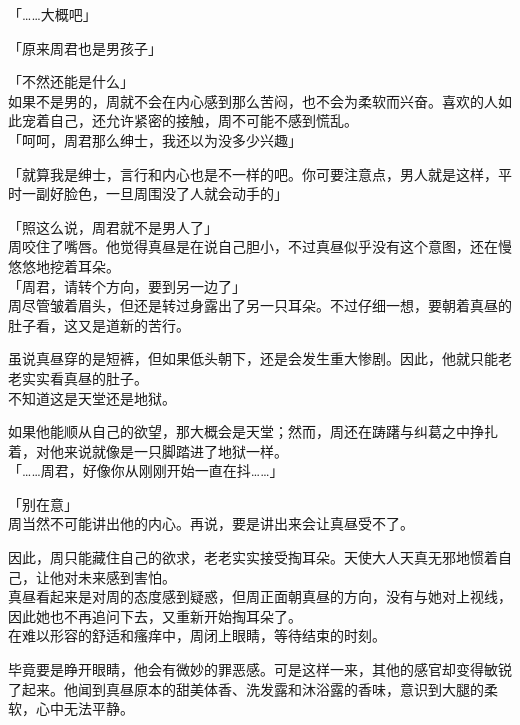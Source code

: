 「……大概吧」

「原来周君也是男孩子」

「不然还能是什么」\\

如果不是男的，周就不会在内心感到那么苦闷，也不会为柔软而兴奋。喜欢的人如此宠着自己，还允许紧密的接触，周不可能不感到慌乱。\\

「呵呵，周君那么绅士，我还以为没多少兴趣」

「就算我是绅士，言行和内心也是不一样的吧。你可要注意点，男人就是这样，平时一副好脸色，一旦周围没了人就会动手的」

「照这么说，周君就不是男人了」\\

周咬住了嘴唇。他觉得真昼是在说自己胆小，不过真昼似乎没有这个意图，还在慢悠悠地挖着耳朵。\\

「周君，请转个方向，要到另一边了」\\

周尽管皱着眉头，但还是转过身露出了另一只耳朵。不过仔细一想，要朝着真昼的肚子看，这又是道新的苦行。

虽说真昼穿的是短裤，但如果低头朝下，还是会发生重大惨剧。因此，他就只能老老实实看真昼的肚子。\\

不知道这是天堂还是地狱。

如果他能顺从自己的欲望，那大概会是天堂；然而，周还在踌躇与纠葛之中挣扎着，对他来说就像是一只脚踏进了地狱一样。\\

「……周君，好像你从刚刚开始一直在抖……」

「别在意」\\

周当然不可能讲出他的内心。再说，要是讲出来会让真昼受不了。

因此，周只能藏住自己的欲求，老老实实接受掏耳朵。天使大人天真无邪地惯着自己，让他对未来感到害怕。\\

真昼看起来是对周的态度感到疑惑，但周正面朝真昼的方向，没有与她对上视线，因此她也不再追问下去，又重新开始掏耳朵了。\\

在难以形容的舒适和瘙痒中，周闭上眼睛，等待结束的时刻。

毕竟要是睁开眼睛，他会有微妙的罪恶感。可是这样一来，其他的感官却变得敏锐了起来。他闻到真昼原本的甜美体香、洗发露和沐浴露的香味，意识到大腿的柔软，心中无法平静。\\

